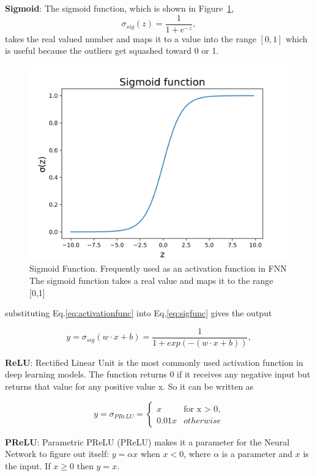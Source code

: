 \textbf{Sigmoid}: The sigmoid function, which is shown in Figure~\ref{fig:sigmoid},
\begin{equation}
\label{eq:sigfunc}
  \sigma_{sig} (z) = \frac{1}{1 + e^{-z}},
\end{equation}
takes the real valued number and maps it to a value into the range $[0,1]$ which is useful because the outliers get squashed toward 0 or 1.

\begin{figure}
  \centering
  \includegraphics[width=0.5\linewidth]{Pictures/sig.PNG}
  \caption{Sigmoid Function. Frequently used as an activation function in FNN
  The sigmoid function takes a real value and maps it to the range [0,1]}
  \label{fig:sigmoid}
\end{figure}


substituting Eq.\ref{eq:activationfunc} into Eq.\ref{eq:sigfunc} 
gives the output 

\begin{equation}
\label{eq:sig_full}
  y = \sigma_{sig} (w\cdot  x + b) = \frac{1}{1 + exp(-(w\cdot  x + b))},
\end{equation}

\textbf{ReLU}: Rectified Linear Unit is the most commonly used activation function in deep learning models. The function returns 0 if it receives any negative input but returns that value for any positive value  x. So it can be written as

\begin{equation}
  y = \sigma_{PReLU} = \begin{cases} x & \text{for x > 0},   \\
        0.01 x & otherwise      %
        \end{cases}
\end{equation}


\textbf{PReLU}: Parametric PReLU (PReLU) makes it a parameter for the Neural Network to figure out itself: $y = \alpha x$ when $x < 0$, where $\alpha$ is a parameter and $x$ is the input. If $x \geq 0$ then $y = x$. 

